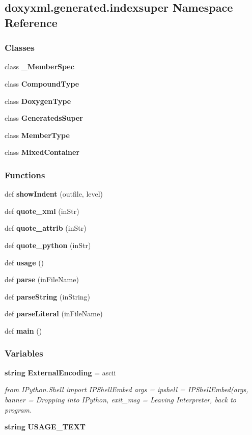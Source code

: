 \subsection{doxyxml.\+generated.\+indexsuper Namespace Reference}
\label{namespacedoxyxml_1_1generated_1_1indexsuper}
\subsubsection*{Classes}
\begin{DoxyCompactItemize}
\item 
class {\bf \+\_\+\+Member\+Spec}
\item 
class {\bf Compound\+Type}
\item 
class {\bf Doxygen\+Type}
\item 
class {\bf Generateds\+Super}
\item 
class {\bf Member\+Type}
\item 
class {\bf Mixed\+Container}
\end{DoxyCompactItemize}
\subsubsection*{Functions}
\begin{DoxyCompactItemize}
\item 
def {\bf show\+Indent} (outfile, level)
\item 
def {\bf quote\+\_\+xml} (in\+Str)
\item 
def {\bf quote\+\_\+attrib} (in\+Str)
\item 
def {\bf quote\+\_\+python} (in\+Str)
\item 
def {\bf usage} ()
\item 
def {\bf parse} (in\+File\+Name)
\item 
def {\bf parse\+String} (in\+String)
\item 
def {\bf parse\+Literal} (in\+File\+Name)
\item 
def {\bf main} ()
\end{DoxyCompactItemize}
\subsubsection*{Variables}
\begin{DoxyCompactItemize}
\item 
{\bf string} {\bf External\+Encoding} = \textquotesingle{}ascii\textquotesingle{}
\begin{DoxyCompactList}\small\item\em from I\+Python.\+Shell import I\+P\+Shell\+Embed args = \textquotesingle{}\textquotesingle{} ipshell = I\+P\+Shell\+Embed(args, banner = \textquotesingle{}Dropping into I\+Python\textquotesingle{}, exit\+\_\+msg = \textquotesingle{}Leaving Interpreter, back to program. \end{DoxyCompactList}\item 
{\bf string} {\bf U\+S\+A\+G\+E\+\_\+\+T\+E\+XT}
\end{DoxyCompactItemize}



